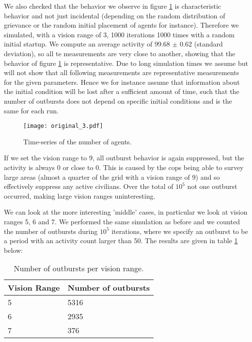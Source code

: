 \documentclass[11pt,a4paper,onecolumn]{article}
\begin{document}
We also checked that the behavior we observe in figure \ref{fig:3} is characteristic behavior and not just incidental (depending on the random distribution of grievance or the random initial placement of agents for instance). Therefore we simulated, with a vision range of 3, 1000 iterations 1000 times with a random initial startup. We compute an average activity of 99.68 $\pm$ 0.62 (standard deviation), so all te measurements are very close to another, showing that the behavior of figure \ref{fig:3} is representative. Due to long simulation times we assume but will not show that all following measurements are representative measurements for the given parameters. Hence we for instance assume that information about the initial condition will be lost after a sufficient amount of time, such that the number of outbursts does not depend on specific initial conditions and is the same for each run.

\begin{figure}[H]
  \centering
  \texttt{[image: original\_3.pdf]}
  \caption{Time-series of the number of agents.}
  \label{fig:3}
\end{figure}

If we set the vision range to 9, all outburst behavior is again suppressed, but the activity is always 0 or close to 0. This is caused by the cops being able to survey large areas (almost a quarter of the grid with a vision range of 9) and so effectively suppress any active civilians. Over the total of $10^5$ not one outburst occurred, making large vision ranges uninteresting.

We can look at the more interesting 'middle' cases, in particular we look at vision ranges 5, 6 and 7. We performed the same simulation as before and we counted the number of outbursts during $10^5$ iterations, where we specify an outburst to be a period with an activity count larger than 50. The results are given in table \ref{tab:outburst} below:

\begin{table}[H]
  \centering
  \begin{tabular}{l | l}
    Vision Range & Number of outbursts \\
    \hline
    5 & 5316 \\
    6 & 2935 \\
    7 & 376
  \end{tabular}
  \caption{Number of outbursts per vision range.}
  \label{tab:outburst}
\end{table}
\end{document}
